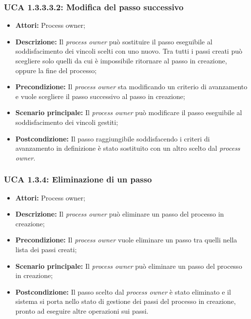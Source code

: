 \hypertarget{A1.3.3.3.2}{}
\subsubsection{UCA 1.3.3.3.2: Modifica del passo successivo}
\begin{itemize}
\item \textbf{Attori:} Process owner;
\item \textbf{Descrizione:}
Il \textit{process owner} può sostituire il passo eseguibile al soddisfacimento dei vincoli scelti con uno nuovo. Tra tutti i passi creati può scegliere solo quelli da cui è impossibile ritornare al passo in creazione, oppure la fine del processo;
\item \textbf{Precondizione:}
Il \textit{process owner} sta modificando un criterio di avanzamento e vuole scegliere il passo successivo al passo in creazione;
\item \textbf{Scenario principale:}
Il \textit{process owner} può modificare il passo eseguibile al soddisfacimento dei vincoli gestiti;
\item \textbf{Postcondizione:}
Il passo raggiungibile soddisfacendo i criteri di avanzamento in definizione è stato sostituito con un altro scelto dal \textit{process owner}.
\end{itemize}

\hypertarget{A1.3.4}{}
\subsubsection{UCA 1.3.4: Eliminazione di un passo}
\begin{itemize}
\item \textbf{Attori:} Process owner;
\item \textbf{Descrizione:}
Il \textit{process owner} può eliminare un passo del processo in creazione;
\item \textbf{Precondizione:}
Il \textit{process owner} vuole eliminare un passo tra quelli nella lista dei passi creati;
\item \textbf{Scenario principale:}
Il \textit{process owner} può eliminare un passo del processo in creazione;
\item \textbf{Postcondizione:}
Il passo scelto dal \textit{process owner} è stato eliminato e il sistema si porta nello stato di gestione dei passi del processo in creazione, pronto ad eseguire altre operazioni sui passi.
\end{itemize}

